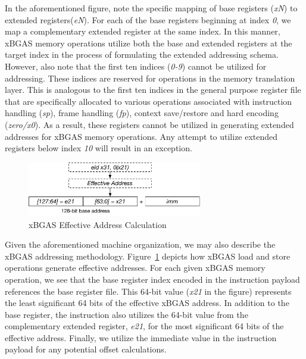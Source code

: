 \documentclass{article}
\begin{document}
In the aforementioned figure, note the specific mapping of base registers 
(\textit{xN}) to extended registers(\textit{eN}).  For each of the base 
registers beginning at index \textit{0}, we map a complementary extended 
register at the same index.  In this manner, xBGAS memory operations 
utilize both the base and extended registers at the target index in the process 
of formulating the extended addressing schema.  However, also note that 
the first ten indices (\textit{0-9}) cannot be utilized for addressing.  These 
indices are reserved for operations in the memory translation layer.  This is 
analogous to the first ten indices in the general purpose register file 
that are specifically allocated to various operations associated with instruction 
handling (\textit{sp}), frame handling (\textit{fp}), context save/restore 
and hard encoding (\textit{zero/x0}).  As a result, these registers cannot be 
utilized in generating extended addresses for xBGAS memory operations.  
Any attempt to utilize extended registers below index \textit{10} will 
result in an exception.    

\begin{figure}[h!]
\begin{center}
\includegraphics[width=3in]{figures/effectiveaddress.pdf}
\caption{xBGAS Effective Address Calculation}
\label{fig:effectiveaddr}
\end{center}
\end{figure}

Given the aforementioned machine organization, we may also describe the xBGAS addressing methodology.  
Figure~\ref{fig:effectiveaddr} depicts how xBGAS load and store operations generate effective addresses.  For each 
given xBGAS memory operation, we see that the base register index encoded in the instruction payload references 
the base register file.  This 64-bit value (\textit{x21} in the figure) represents the least significant 64 bits of the effective 
xBGAS address.  In addition to the base register, the instruction also utilizes the 64-bit value from the complementary 
extended register, \textit{e21}, for the most significant 64 bits of the effective address.  Finally, we utilize the immediate 
value in the instruction payload for any potential offset calculations.
\end{document}
